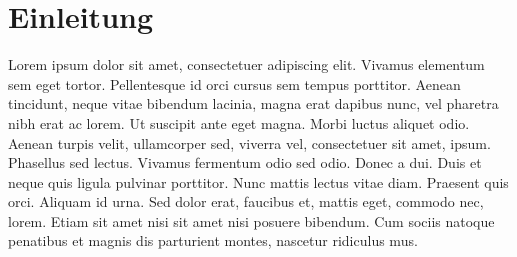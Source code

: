 \chapter{Einleitung}
Lorem ipsum dolor sit amet, consectetuer adipiscing elit. Vivamus elementum sem eget tortor. Pellentesque id orci cursus sem tempus porttitor. Aenean tincidunt, neque vitae bibendum lacinia, magna erat dapibus nunc, vel pharetra nibh erat ac lorem. Ut suscipit ante eget magna. Morbi luctus aliquet odio. Aenean turpis velit, ullamcorper sed, viverra vel, consectetuer sit amet, ipsum. Phasellus sed lectus. Vivamus fermentum odio sed odio. Donec a dui. Duis et neque quis ligula pulvinar porttitor. Nunc mattis lectus vitae diam. Praesent quis orci. Aliquam id urna. Sed dolor erat, faucibus et, mattis eget, commodo nec, lorem. Etiam sit amet nisi sit amet nisi posuere bibendum. Cum sociis natoque penatibus et magnis dis parturient montes, nascetur ridiculus mus.

